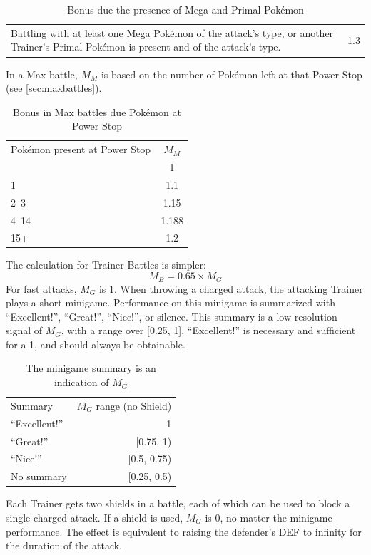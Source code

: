 \begin{itemize}
\begin{table}[h!]
\begin{tabular}{p{}c}
         Battling with at least one Mega Pokémon of the attack's type,
          or another Trainer's Primal Pokémon is present and of
          the attack's type. & 1.3 \\
       \end{tabular}
     \caption{Bonus due the presence of Mega and Primal Pokémon}
   \end{table}
   In a Max battle, $M_M$ is based on the number of Pokémon left at that Power Stop
     (see \autoref{sec:maxbattles}).
   \begin{table}[h!]
     \centering
       \begin{tabular}{lc}
         Pokémon present at Power Stop & $M_M$ \\
         \Midrule
         0 & 1 \\
         1 & 1.1 \\
         2--3 & 1.15 \\
         4--14 & 1.188 \\
         15+ & 1.2 \\
       \end{tabular}
     \caption{Bonus in Max battles due Pokémon at Power Stop\label{table:powerstopbonus}}
   \end{table}
\end{itemize}
The calculation for Trainer Battles is simpler:
\[ M_B = 0.65 \times M_G \]
For fast attacks, $M_G$ is 1.
When throwing a charged attack, the attacking Trainer plays a short minigame.
Performance on this minigame is summarized with ``Excellent!'', ``Great!'',
``Nice!'', or silence.
This summary is a low-resolution signal of $M_G$, with a range over [0.25, 1].
``Excellent!'' is necessary and sufficient for a 1, and should always be obtainable.
\begin{table}
\centering
\begin{tabular}{l r}
Summary & $M_G$ range (no Shield) \\
\Midrule
``Excellent!'' & 1 \\
``Great!'' & [0.75, 1) \\
``Nice!'' & [0.5, 0.75) \\
No summary & [0.25, 0.5) \\
\end{tabular}
\caption{The minigame summary is an indication of $M_G$}
\end{table}
Each Trainer gets two shields in a battle, each of which can be used
 to block a single charged attack.
If a shield is used, $M_G$ is 0, no matter the minigame performance.
The effect is equivalent to raising the defender's DEF to infinity for the
  duration of the attack.

